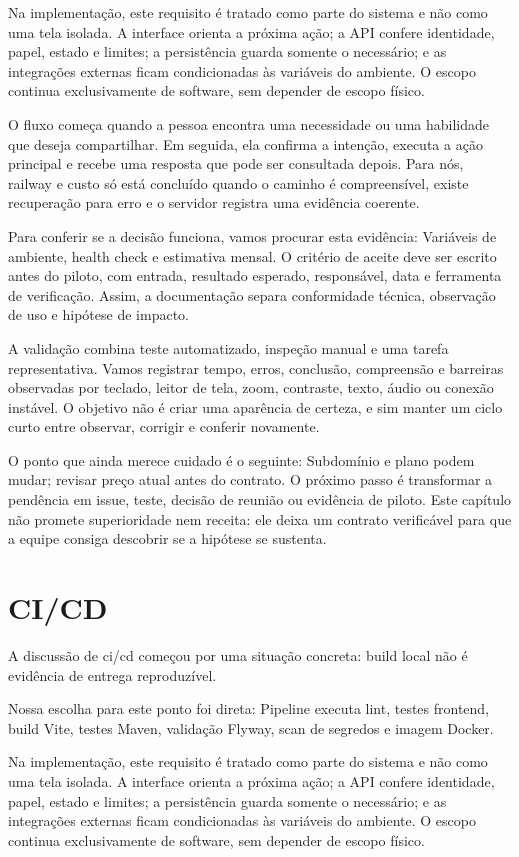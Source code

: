 \documentclass[12pt,oneside,a4paper,article]{abntex2}
\begin{document}
Na implementação, este requisito é tratado como parte do sistema e não como uma tela isolada. A interface orienta a próxima ação; a API confere identidade, papel, estado e limites; a persistência guarda somente o necessário; e as integrações externas ficam condicionadas às variáveis do ambiente. O escopo continua exclusivamente de software, sem depender de escopo físico.

O fluxo começa quando a pessoa encontra uma necessidade ou uma habilidade que deseja compartilhar. Em seguida, ela confirma a intenção, executa a ação principal e recebe uma resposta que pode ser consultada depois. Para nós, railway e custo só está concluído quando o caminho é compreensível, existe recuperação para erro e o servidor registra uma evidência coerente.

Para conferir se a decisão funciona, vamos procurar esta evidência: Variáveis de ambiente, health check e estimativa mensal. O critério de aceite deve ser escrito antes do piloto, com entrada, resultado esperado, responsável, data e ferramenta de verificação. Assim, a documentação separa conformidade técnica, observação de uso e hipótese de impacto.

A validação combina teste automatizado, inspeção manual e uma tarefa representativa. Vamos registrar tempo, erros, conclusão, compreensão e barreiras observadas por teclado, leitor de tela, zoom, contraste, texto, áudio ou conexão instável. O objetivo não é criar uma aparência de certeza, e sim manter um ciclo curto entre observar, corrigir e conferir novamente.

O ponto que ainda merece cuidado é o seguinte: Subdomínio e plano podem mudar; revisar preço atual antes do contrato. O próximo passo é transformar a pendência em issue, teste, decisão de reunião ou evidência de piloto. Este capítulo não promete superioridade nem receita: ele deixa um contrato verificável para que a equipe consiga descobrir se a hipótese se sustenta.

\section{CI/CD}
A discussão de ci/cd começou por uma situação concreta: build local não é evidência de entrega reproduzível.

Nossa escolha para este ponto foi direta: Pipeline executa lint, testes frontend, build Vite, testes Maven, validação Flyway, scan de segredos e imagem Docker.

Na implementação, este requisito é tratado como parte do sistema e não como uma tela isolada. A interface orienta a próxima ação; a API confere identidade, papel, estado e limites; a persistência guarda somente o necessário; e as integrações externas ficam condicionadas às variáveis do ambiente. O escopo continua exclusivamente de software, sem depender de escopo físico.
\end{document}
